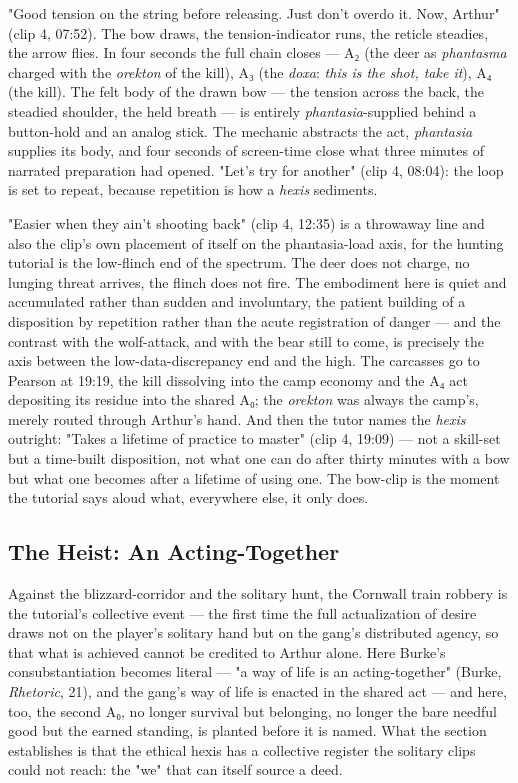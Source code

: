 \documentclass{article}
\begin{document}
"Good tension on the string before releasing. Just don't overdo it. Now, Arthur" (clip 4, 07:52). The bow draws, the tension-indicator runs, the reticle steadies, the arrow flies. In four seconds the full chain closes — A₂ (the deer as \textit{phantasma} charged with the \textit{orekton} of the kill), A₃ (the \textit{doxa}: \textit{this is the shot, take it}), A₄ (the kill). The felt body of the drawn bow — the tension across the back, the steadied shoulder, the held breath — is entirely \textit{phantasia}-supplied behind a button-hold and an analog stick. The mechanic abstracts the act, \textit{phantasia} supplies its body, and four seconds of screen-time close what three minutes of narrated preparation had opened. "Let's try for another" (clip 4, 08:04): the loop is set to repeat, because repetition is how a \textit{hexis} sediments.

"Easier when they ain't shooting back" (clip 4, 12:35) is a throwaway line and also the clip's own placement of itself on the phantasia-load axis, for the hunting tutorial is the low-flinch end of the spectrum. The deer does not charge, no lunging threat arrives, the flinch does not fire. The embodiment here is quiet and accumulated rather than sudden and involuntary, the patient building of a disposition by repetition rather than the acute registration of danger — and the contrast with the wolf-attack, and with the bear still to come, is precisely the axis between the low-data-discrepancy end and the high. The carcasses go to Pearson at 19:19, the kill dissolving into the camp economy and the A₄ act depositing its residue into the shared A₀; the \textit{orekton} was always the camp's, merely routed through Arthur's hand. And then the tutor names the \textit{hexis} outright: "Takes a lifetime of practice to master" (clip 4, 19:09) — not a skill-set but a time-built disposition, not what one can do after thirty minutes with a bow but what one becomes after a lifetime of using one. The bow-clip is the moment the tutorial says aloud what, everywhere else, it only does.

\bigskip

\subsection*{The Heist: An Acting-Together}

Against the blizzard-corridor and the solitary hunt, the Cornwall train robbery is the tutorial's collective event — the first time the full actualization of desire draws not on the player's solitary hand but on the gang's distributed agency, so that what is achieved cannot be credited to Arthur alone. Here Burke's consubstantiation becomes literal — "a way of life is an acting-together" (Burke, \textit{Rhetoric}, 21), and the gang's way of life is enacted in the shared act — and here, too, the second A₀, no longer survival but belonging, no longer the bare needful good but the earned standing, is planted before it is named. What the section establishes is that the ethical hexis has a collective register the solitary clips could not reach: the "we" that can itself source a deed.
\end{document}
